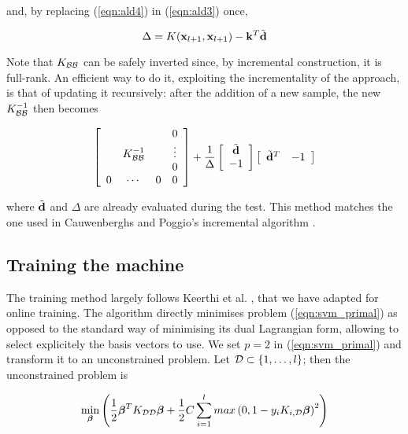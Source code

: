 \noindent and, by replacing (\ref{eqn:ald4}) in (\ref{eqn:ald3}) once,

\begin{equation} \label{eqn:ald5}
  \Delta = K(\mathbf{x}_{l+1},\mathbf{x}_{l+1}) - \mathbf{k}^T \tilde{\mathbf{d}}
\end{equation}

Note that $K_{\mathcal{B}\mathcal{B}}$ can be safely inverted since, by incremental
construction, it is full-rank. An efficient way to do it, exploiting
the incrementality of the approach, is that of updating it
recursively: after the addition of a new sample, the new
$K_{\mathcal{B}\mathcal{B}}^{-1}$ then becomes

\begin{equation} \label{eqn:inv_upd}
  \left[\begin{array}{cccc}
       &               &   & 0 \\
       & K_{\mathcal{B}\mathcal{B}}^{-1} &   & \vdots \\
       &               &   & 0 \\
     0 &       \cdots  & 0 & 0
  \end{array}\right]
  +
  \frac{1}{\Delta}
  \left[\begin{array}{c}
    \tilde{\mathbf{d}} \\
    -1
  \end{array}\right]
  \left[\begin{array}{cc}
    \tilde{\mathbf{d}}^T & -1
  \end{array}\right]
\end{equation}

\noindent where $\tilde{\mathbf{d}}$ and $\Delta$ are already evaluated during the
test. This method matches the one used in Cauwenberghs and Poggio's
incremental algorithm \cite{CauwenberghsP00}.

\subsection{Training the machine}

The training method largely follows Keerthi et
al. \cite{KeerthiDC05,KeerthiCDC06}, that we have adapted for online
training. The algorithm directly minimises problem
(\ref{eqn:svm_primal}) as opposed to the standard way of minimising
its dual Lagrangian form, allowing to select explicitely the basis
vectors to use. We set $p=2$ in (\ref{eqn:svm_primal}) and transform
it to an unconstrained problem.  Let $\mathcal{D} \subset \{1,\ldots,l\}$; then
the unconstrained problem is

\begin{equation} \label{eqn:primal}
  \min_{\boldsymbol{\beta}} \left( 
      \frac{1}{2} \boldsymbol{\beta}^T K_{\mathcal{D}\mathcal{D}} \boldsymbol{\beta}
    + \frac{1}{2} C \sum_{i=1}^l max \left(0,1-y_i K_{i,\mathcal{D}} \boldsymbol{\beta} \right)^2
  \right)
\end{equation}

